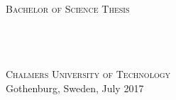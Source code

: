 \thispagestyle{empty}
\begin{center}
	\textsc{\large Bachelor of Science Thesis}\\[4cm]
	\textbf{\Large\varHeadline} \\[1cm]
	{\large \varSubtitle}\\[1cm]
	{\large \varNames}
	
	\vfill	
	
	\varDepartment \\
	\textsc{Chalmers University of Technology} \\
	Gothenburg, Sweden, July 2017 \\
\end{center}

\setlength{\parindent}{1cm}                         
